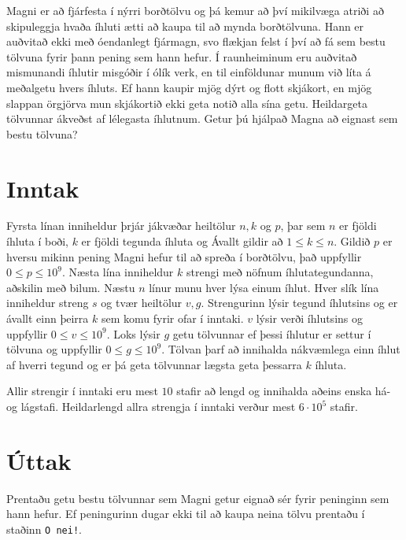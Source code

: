 
Magni er að fjárfesta í nýrri borðtölvu og þá kemur að því mikilvæga atriði að skipuleggja hvaða íhluti ætti að kaupa til að mynda borðtölvuna.
Hann er auðvitað ekki með óendanlegt fjármagn, svo flækjan felst í því að fá sem bestu tölvuna fyrir þann pening sem hann hefur. Í raunheiminum
eru auðvitað mismunandi íhlutir misgóðir í ólík verk, en til einföldunar munum við líta á meðalgetu hvers íhluts. Ef hann kaupir mjög dýrt og
flott skjákort, en mjög slappan örgjörva mun skjákortið ekki geta notið alla sína getu. Heildargeta tölvunnar ákveðst af lélegasta íhlutnum.
Getur þú hjálpað Magna að eignast sem bestu tölvuna?

\section*{Inntak}
Fyrsta línan inniheldur þrjár jákvæðar heiltölur $n, k$ og $p$, þar sem $n$ er fjöldi íhluta í boði, $k$ er fjöldi tegunda íhluta og
Ávallt gildir að $1 \leq k \leq n$.
Gildið $p$ er hversu mikinn pening Magni hefur til að spreða í borðtölvu, það uppfyllir $0 \leq p \leq 10^9$.
Næsta lína inniheldur $k$ strengi með nöfnum íhlutategundanna, aðskilin með bilum. Næstu $n$ línur munu hver lýsa einum íhlut. Hver
slík lína inniheldur streng $s$ og tvær heiltölur $v, g$. Strengurinn lýsir tegund íhlutsins og er ávallt einn þeirra $k$ sem komu fyrir
ofar í inntaki. $v$ lýsir verði íhlutsins og uppfyllir $0 \leq v \leq 10^9$. Loks lýsir $g$ getu tölvunnar ef þessi íhlutur er settur
í tölvuna og uppfyllir $0 \leq g \leq 10^9$. Tölvan þarf að innihalda nákvæmlega einn íhlut af hverri tegund og er þá geta tölvunnar lægsta
geta þessarra $k$ íhluta.

Allir strengir í inntaki eru mest $10$ stafir að lengd og innihalda aðeins enska há- og lágstafi. Heildarlengd allra strengja í inntaki
verður mest $6 \cdot 10^5$ stafir.

\section*{Úttak}
Prentaðu getu bestu tölvunnar sem Magni getur eignað sér fyrir peninginn sem hann hefur. Ef peningurinn dugar ekki til að kaupa neina tölvu
prentaðu í staðinn \texttt{O nei!}.

